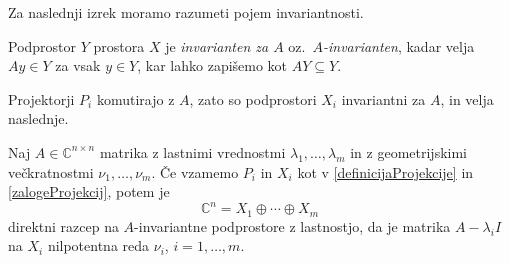 \documentclass[mat1]{fmfdelo}
\newcommand{\C}{\mathbb C}
\begin{document}
Za naslednji izrek moramo razumeti pojem invariantnosti.
\begin{definicija}
    Podprostor $Y$ prostora $X$ je \emph{invarianten za $A$} oz.\ \emph{$A$-invarianten}, kadar velja $A y \in Y$ za vsak $y \in Y$, kar lahko zapišemo kot $A Y \subseteq Y$.
\end{definicija}
Projektorji $P_i$ komutirajo z $A$, zato so podprostori $X_i$ invariantni za $A$, in velja naslednje. 
\begin{izrek}\label{trditevSpektralniRazcep}
    Naj $A \in \C^{n \times n}$ matrika z lastnimi vrednostmi $\lambda_1, \ldots, \lambda_m$ in z geometrijskimi večkratnostmi $\nu_1, \ldots, \nu_m$. Če vzamemo $P_i$ in $X_i$ kot v \eqref{definicijaProjekcije} in \eqref{zalogeProjekcij}, potem je
    \begin{equation}\label{eqSpektralniRazcep}
        \C^n = X_1 \oplus \cdots \oplus X_m
    \end{equation}
    direktni razcep na $A$-invariantne podprostore z lastnostjo, da je matrika $A - \lambda_i I$ na $X_i$ nilpotentna reda $\nu_i$, $i = 1, \ldots, m$.
\end{izrek}
\end{document}
